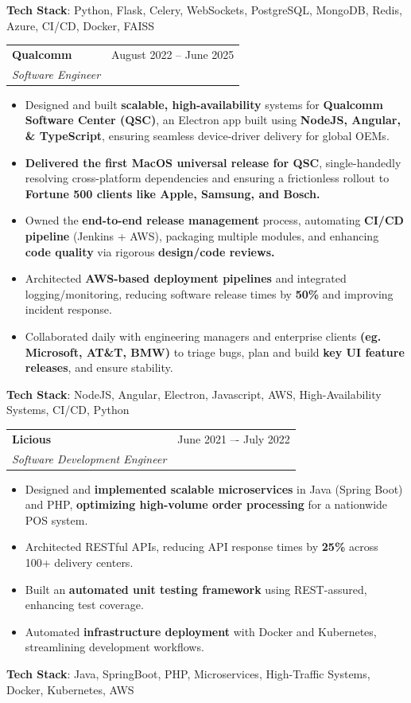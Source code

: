 \documentclass[letterpaper,11pt]{article}
\makeatletter
\newcommand{\resumeItem}[1]{
  \item\small{
    {#1 \vspace{-2pt}}
  }
}
\newcommand{\resumeSubheading}[4]{
  \vspace{-2pt}\item
    \begin{tabular*}{0.97\textwidth}[t]{l@{\extracolsep{\fill}}r}
      \textbf{#1} & #2 \\
      \textit{\small#3} & \textit{\small #4} \\
    \end{tabular*}\vspace{-7pt}
}
\newcommand{\resumeItemListStart}{\begin{itemize}}
\newcommand{\resumeItemListEnd}{\end{itemize}\vspace{-5pt}}
\makeatother
\begin{document}
      \textbf{Tech Stack}: Python, Flask, Celery, WebSockets, PostgreSQL, MongoDB, Redis, Azure, CI/CD, Docker, FAISS

    \resumeSubheading
      {Qualcomm}{August 2022 -- June 2025}
      {Software Engineer}{ }
      \resumeItemListStart
        \resumeItem{Designed and built \textbf{scalable, high-availability} systems for \textbf{Qualcomm Software Center (QSC)}, an Electron app built using \textbf{NodeJS, Angular, \& TypeScript}, ensuring seamless device-driver delivery for global OEMs.}
        \resumeItem{\textbf{Delivered the first MacOS universal release for QSC}, single-handedly resolving cross-platform dependencies and ensuring a frictionless rollout to \textbf{Fortune 500 clients like Apple, Samsung, and Bosch.}}
        \resumeItem{Owned the \textbf{end-to-end release management} process, automating \textbf{CI/CD pipeline} (Jenkins + AWS), packaging multiple modules, and enhancing \textbf{code quality} via rigorous \textbf{design/code reviews.}}
        \resumeItem{Architected \textbf{AWS-based deployment pipelines} and integrated logging/monitoring, reducing software release times by \textbf{50\%} and improving incident response.}
        \resumeItem{Collaborated daily with engineering managers and enterprise clients \textbf{(eg. Microsoft, AT\&T, BMW)} to triage bugs,
        plan and build \textbf{key UI feature releases}, and ensure stability.} \\

      \resumeItemListEnd

      \textbf{Tech Stack}: NodeJS, Angular, Electron, Javascript, AWS, High-Availability Systems, CI/CD, Python

    \resumeSubheading
      {Licious}{June 2021 –- July 2022}
      {Software Development Engineer }{ }
      \resumeItemListStart
        \resumeItem{Designed and \textbf{implemented scalable microservices} in Java (Spring Boot) and PHP, \textbf{optimizing high-volume order processing} for a nationwide POS system.}
        \resumeItem{Architected RESTful APIs, reducing API response times by \textbf{25\%} across {100+ delivery centers.}}
        \resumeItem{Built an \textbf{automated unit testing framework} using REST-assured, enhancing test coverage.}
        \resumeItem{Automated \textbf{infrastructure deployment} with Docker and Kubernetes, streamlining development workflows.} \\

    \resumeItemListEnd

    \textbf{Tech Stack}: Java, SpringBoot, PHP, Microservices, High-Traffic Systems, Docker, Kubernetes, AWS \\
\end{document}
